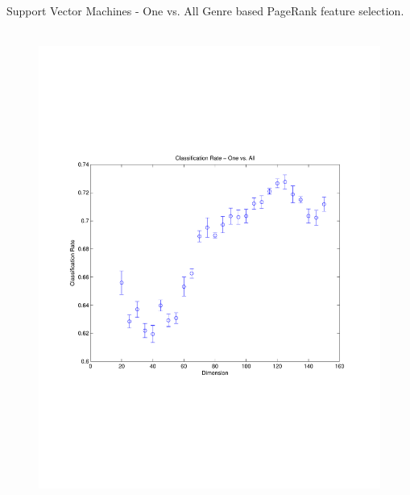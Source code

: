 \documentclass[xcolor=dvipsnames,t]{beamer} %
\begin{document}
\begin{frame}{Support Vector Machines - One vs. All}
   Genre based PageRank feature selection.
   ~\\[-9em]
   \begin{figure}
      \centering
      \includegraphics[width=\textwidth]{figures/optimSVMOVAprDim_genre05_Dale.pdf}
   \end{figure}
\end{frame}
\end{document}
